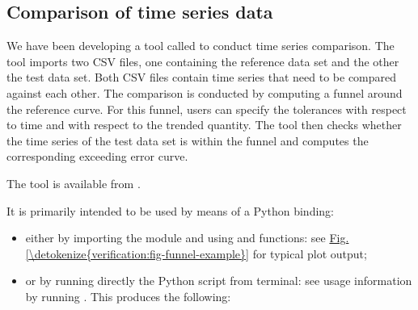 \documentclass[letterpaper,10pt, openany,english]{sphinxmanual}
\begin{document}
\subsection{Comparison of time series data}
\label{\detokenize{verification:comparison-of-time-series-data}}
We have been developing a tool called  to conduct time series comparison.
The tool imports two CSV files, one containing the reference data set and
the other the test data set.
Both CSV files contain time series that need to be compared against each other.
The comparison is conducted by computing a funnel around the
reference curve. For this funnel, users can specify the tolerances with respect
to time and with respect to the trended quantity. The tool then
checks whether the time series of the test data set is within the funnel and
computes the corresponding exceeding error curve.

The tool is available from
.

It is primarily intended to be used by means of a Python binding:
\begin{itemize}
\item {} 
either by importing the module  and using 
and  functions: see \hyperref[\detokenize{verification:fig-funnel-example}]{Fig.\@ \ref{\detokenize{verification:fig-funnel-example}}} for typical
plot output;

\item {} 
or by running directly the Python script from terminal: see usage information
by running . This produces the following:

\end{itemize}
\end{document}
